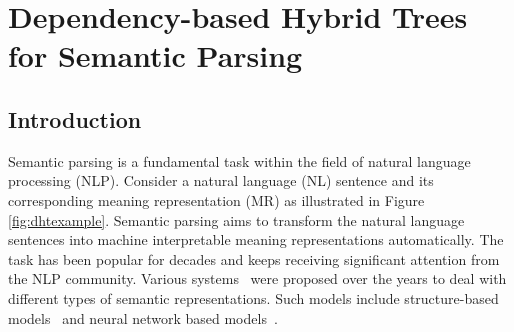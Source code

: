 
\chapter{Dependency-based Hybrid Trees for Semantic Parsing} %

\label{Chapter6} %


\section{Introduction}
\label{sec:intro}

Semantic parsing is a fundamental task within the field of natural language processing (NLP).
Consider a natural language (NL) sentence and its corresponding meaning representation (MR) as illustrated in Figure \ref{fig:dhtexample}.
Semantic parsing aims to transform the natural language sentences into machine interpretable meaning representations automatically. 
The task has been popular for decades and keeps receiving significant attention from the NLP community. 
Various systems~\cite{zelle1996learning,kate2005learning,zettlemoyer2005learning,liang11learning} were proposed over the years to deal with different types of semantic representations.
Such models include structure-based models~\cite{wong2006learning,lu2008generative,kwiatkowski2010inducing,jones2012semantic}  and neural network based models~\cite{dong2016language,cheng2017learning}. 


